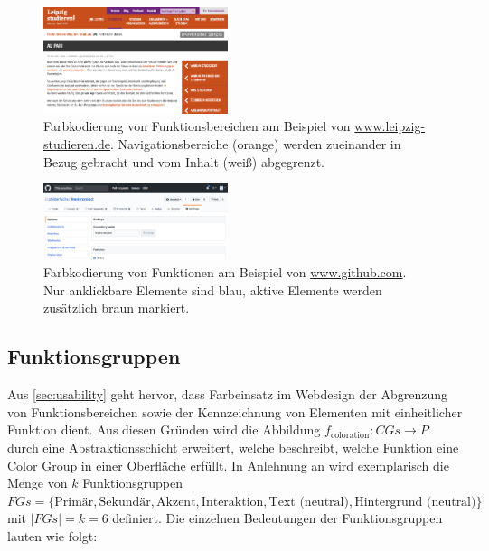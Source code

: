 \begin{figure}[h]
	\centering
	\includegraphics[width=0.48\textwidth]{img/functional_areas.png}
	\caption{Farbkodierung von Funktionsbereichen am Beispiel von \url{www.leipzig-studieren.de}. Navigationsbereiche (orange) werden zueinander in Bezug gebracht und vom Inhalt (weiß) abgegrenzt.}
	\label{fig:functional_areas}
\end{figure}

\begin{figure}[h]
	\centering
	\includegraphics[width=0.48\textwidth]{img/functions.png}
	\caption{Farbkodierung von Funktionen am Beispiel von \url{www.github.com}. Nur anklickbare Elemente sind blau, aktive Elemente werden zusätzlich braun markiert.}
	\label{fig:functions}
\end{figure}

\subsection{Funktionsgruppen}
\label{sec:funktionsgruppen}

Aus \autoref{sec:usability} geht hervor, dass Farbeinsatz im Webdesign der Abgrenzung von Funktionsbereichen sowie der Kennzeichnung von Elementen mit einheitlicher Funktion dient. Aus diesen Gründen wird die Abbildung $f_\text{coloration}: CGs \to P$ durch eine Abstraktionsschicht erweitert, welche beschreibt, welche Funktion eine Color Group in einer Oberfläche erfüllt. In Anlehnung an \citep{google,  smashing} wird exemplarisch die Menge von $k$ Funktionsgruppen $FGs = \{\text{Primär}, \text{Sekundär}, \text{Akzent}, \text{Interaktion}, \text{Text (neutral)}, \text{Hintergrund (neutral)}\}$ mit $|FGs| = k = 6$ definiert. Die einzelnen Bedeutungen der Funktionsgruppen lauten wie folgt:

